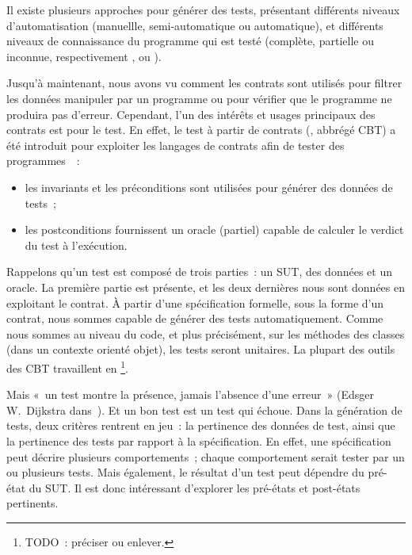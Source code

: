 Il existe plusieurs approches pour générer des tests, présentant différents
niveaux d'automatisation (manuellle, semi-automatique ou automatique), et
différents niveaux de connaissance du programme qui est testé (complète,
partielle ou inconnue, respectivement ,
 ou ).

Jusqu'à maintenant, nous avons vu comment les contrats sont utilisés pour
{\strong filtrer} les données manipuler par un programme ou pour vérifier que le
programme ne produira pas d'erreur. Cependant, l'un des intérêts et usages
principaux des contrats est pour le {\strong test}. En effet, le {\strong test à
partir de contrats} (, abbrégé CBT) a été
introduit pour exploiter les langages de contrats afin de tester des
programmes~~:

\begin{itemize}

\item les invariants et les préconditions sont utilisées pour {\strong générer
des données} de tests~;

\item les postconditions {\strong fournissent un oracle} (partiel) capable de
calculer le verdict du test à l'exécution.

\end{itemize}

Rappelons qu'un test est composé de trois parties~: un SUT, des données et un
oracle. La première partie est présente, et les deux dernières nous sont données
en exploitant le contrat. À partir d'une spécification formelle, sous la forme
d'un contrat, nous sommes capable de générer des tests automatiquement. Comme
nous sommes au niveau du code, et plus précisément, sur les méthodes des classes
(dans un contexte orienté objet), les tests seront {\strong unitaires}. La
plupart des outils des CBT travaillent en \footnote{TODO~:
préciser ou enlever.}.

Mais «~un test montre la présence, jamais l'absence d'une erreur~» (Edsger
W.~Dijkstra dans~). Et un bon test est un test qui échoue. Dans
la génération de tests, deux critères rentrent en jeu~: la pertinence des
données de test, ainsi que la pertinence des tests par rapport à la
spécification. En effet, une spécification peut décrire plusieurs
comportements~; chaque comportement serait tester par un ou plusieurs tests.
Mais également, le résultat d'un test peut dépendre du pré-état du SUT.  Il est
donc intéressant d'explorer les pré-états et post-états pertinents.


